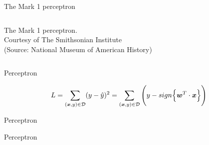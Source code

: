 \begin{frame}[t]{The Mark 1 perceptron}
\begin{columns}[t]
\begin{column}{0.50\textwidth}
\begin{center}
                {\tiny 
                The Mark 1 perceptron.\\
                \color{col:attribution} 
                Courtesy of The Smithsonian Institute\\ (Source: National Museum of American History)\\}
             \end{center}
        \end{column}
        \begin{column}{0.20\textwidth}
        \end{column}
      \end{columns}

\end{frame}

%
%
%

\begin{frame}[t]{Perceptron}

    \begin{equation}
        L = \sum_{(\boldsymbol{x},y) \in \mathcal{D}} (y - \hat{y})^2 
          = \sum_{(\boldsymbol{x},y) \in \mathcal{D}} \Bigg(y - sign\Big\{ \boldsymbol{w}^T \cdot \boldsymbol{x} \Big\}\Bigg)
     \end{equation}


\end{frame}

%
%
%

\begin{frame}[t]{Perceptron}

\end{frame}

%
%
%

\begin{frame}[t]{Perceptron}

\end{frame}
